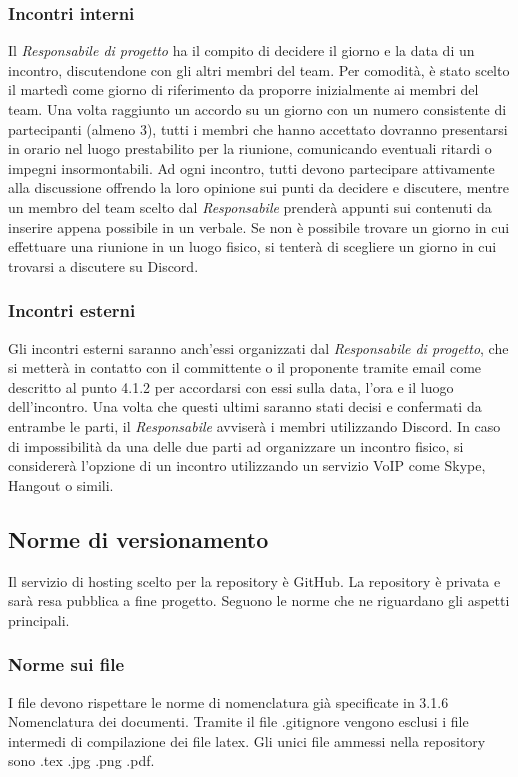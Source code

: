 \subsubsection{Incontri interni}
Il \emph{Responsabile di progetto} ha il compito di decidere il giorno e la data di un incontro, discutendone con gli altri membri del team. Per comodità, è stato scelto il martedì come giorno di riferimento da proporre inizialmente ai membri del team.
\newline
Una volta raggiunto un accordo su un giorno con un numero consistente di partecipanti (almeno 3), tutti i membri che hanno accettato dovranno presentarsi in orario nel luogo prestabilito per la riunione, comunicando eventuali ritardi o impegni insormontabili.
Ad ogni incontro, tutti devono partecipare attivamente alla discussione offrendo la loro opinione sui punti da decidere e discutere, mentre un membro del team scelto dal \emph{Responsabile} prenderà appunti sui contenuti da inserire appena possibile in un verbale.
\newline
Se non è possibile trovare un giorno in cui effettuare una riunione in un luogo fisico, si tenterà di scegliere un giorno in cui trovarsi a discutere su Discord.

\subsubsection{Incontri esterni}
Gli incontri esterni saranno anch'essi organizzati dal \emph{Responsabile di progetto}, che si metterà in contatto con il committente o il proponente tramite email come descritto al punto 4.1.2 per accordarsi con essi sulla data, l'ora e il luogo dell'incontro. Una volta che questi ultimi saranno stati decisi e confermati da entrambe le parti, il \emph{Responsabile} avviserà i membri utilizzando Discord.
In caso di impossibilità da una delle due parti ad organizzare un incontro fisico, si considererà l'opzione di un incontro utilizzando un servizio VoIP come Skype, Hangout o simili.

\subsection{Norme di versionamento}
Il servizio di hosting scelto per la repository è GitHub. La repository è
privata e sarà resa pubblica a fine progetto. Seguono le norme che ne riguardano gli aspetti
principali.
\subsubsection{Norme sui file}
I file devono rispettare le norme di nomenclatura già specificate in 3.1.6 Nomenclatura dei documenti.
Tramite il file .gitignore vengono esclusi i file intermedi di compilazione dei file latex.
Gli unici file ammessi nella repository sono .tex .jpg .png .pdf.

